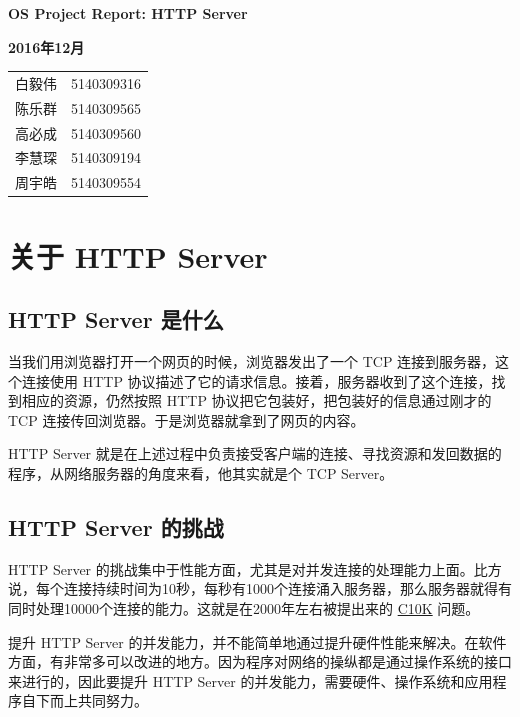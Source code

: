 \documentclass[a4paper]{article}
\begin{document}
\begin{center}
{\LARGE\bf OS Project Report: HTTP Server}
\end{center}

\begin{center}
{\Large\bf 2016年12月}
\end{center}

\begin{center}
\begin{tabular}{cc}
白毅伟 & 5140309316\\
陈乐群 & 5140309565\\
高必成 & 5140309560\\
李慧琛 & 5140309194\\
周宇皓 & 5140309554
\end{tabular}
\end{center}

\newpage
 
\tableofcontents

\newpage


\section{关于 HTTP Server}

\subsection{HTTP Server 是什么}

当我们用浏览器打开一个网页的时候，浏览器发出了一个 TCP 连接到服务器，这个连接使用 HTTP 协议描述了它的请求信息。接着，服务器收到了这个连接，找到相应的资源，仍然按照 HTTP 协议把它包装好，把包装好的信息通过刚才的 TCP 连接传回浏览器。于是浏览器就拿到了网页的内容。

HTTP Server 就是在上述过程中负责接受客户端的连接、寻找资源和发回数据的程序，从网络服务器的角度来看，他其实就是个 TCP Server。

\subsection{HTTP Server 的挑战}

HTTP Server 的挑战集中于性能方面，尤其是对并发连接的处理能力上面。比方说，每个连接持续时间为10秒，每秒有1000个连接涌入服务器，那么服务器就得有同时处理10000个连接的能力。这就是在2000年左右被提出来的 \href{https://en.wikipedia.org/wiki/C10k_problem}{C10K} 问题。

提升 HTTP Server 的并发能力，并不能简单地通过提升硬件性能来解决。在软件方面，有非常多可以改进的地方。因为程序对网络的操纵都是通过操作系统的接口来进行的，因此要提升 HTTP Server 的并发能力，需要硬件、操作系统和应用程序自下而上共同努力。
\end{document}
